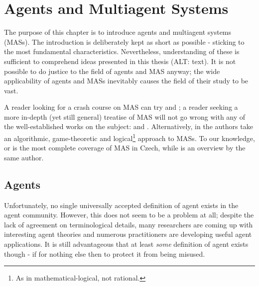 
\chapter{Agents and Multiagent Systems}

The purpose of this chapter is to introduce agents and multiagent systems (MASs).
The introduction is deliberately kept as short as possible - sticking to the most fundamental characteristics.
Nevertheless, understanding of these is sufficient to comprehend ideas presented in this thesis (ALT: text).
It is not possible to do justice to the field of agents and MAS anyway; the wide applicability of agents and MASs inevitably causes the field of their study to be vast.

A reader looking for a crash course on MAS can try \cite{Wooldridge02} and \cite{Wooldridge95}; a reader seeking a more in-depth (yet still general) treatise of MAS will not go wrong with any of the well-established works on the subject: \cite{Wooldridge09} and \cite{Weiss99}.
Alternatively, in \cite{Shoham08} the authors take an algorithmic, game-theoretic and logical\footnote{As in mathematical-logical, not rational.} approach to MASs.
To our knowledge, \cite{Kubik04} or \cite{Kubik00} is the most complete coverage of MAS in Czech, while \cite{Kubik03} is an overview by the same author.

\section{Agents}

Unfortunately, no single universally accepted definition of agent exists in the agent community.
However, this does not seem to be a problem at all; despite the lack of agreement on terminological details, many researchers are coming up with interesting agent theories and numerous practitioners are developing useful agent applications.
It is still advantageous that at least \textit{some} definition of agent exists though - if for nothing else then to protect it from being misused.

